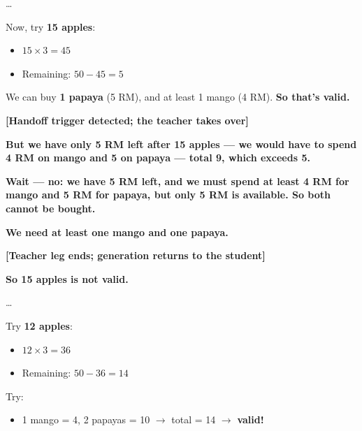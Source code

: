 \documentclass{article} %
\begin{document}
\begin{promptbox}[title={Relay Trajectory}, breakable=false]
\small
\ldots\par

Now, try \textbf{15 apples}:\par

\begin{itemize}[leftmargin=*,itemsep=0.25ex,topsep=0.5ex]
\item $15\times3=45$
\item Remaining: $50-45=5$
\end{itemize}

We can buy \textbf{1 papaya} (5 RM), and at least 1 mango (4 RM). \textbf{So that's valid.}\par

\textcolor{handoffred}{\textbf{[Handoff trigger detected; the teacher takes over]}}\par

\textbf{But we have only 5 RM left after 15 apples --- we would have to spend 4 RM on mango and 5 on papaya --- total 9, which exceeds 5.}\par

\textbf{Wait --- no: we have 5 RM left, and we must spend at least 4 RM for mango and 5 RM for papaya, but only 5 RM is available. So both cannot be bought.}\par

\textbf{We need at least one mango and one papaya.}\par

\textcolor{handoffred}{\textbf{[Teacher leg ends; generation returns to the student]}}\par

\textbf{So 15 apples is not valid.}\par

\ldots\par

Try \textbf{12 apples}:\par

\begin{itemize}[leftmargin=*,itemsep=0.25ex,topsep=0.5ex]
\item $12\times3=36$
\item Remaining: $50-36=14$
\end{itemize}

Try:\par

\begin{itemize}[leftmargin=*,itemsep=0.25ex,topsep=0.5ex]
\item 1 mango = 4, 2 papayas = 10 $\to$ total = 14 $\to$ \textbf{valid!}
\end{itemize}


\end{promptbox}
\end{document}
